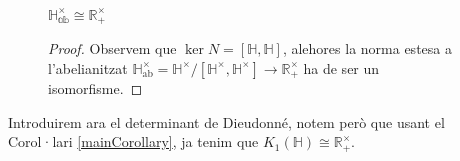 \begin{figure}[!htb]
    \centering
    \begin{minipage}{.66\textwidth}
        \begin{cor} \label{HR}
$\mathbb{H_\text{ab}^\times}\cong \mathbb{R}^\times_+$
\end{cor}
\begin{proof}
Observem que $\ker N = [\mathbb{H},\mathbb{H}]$, alehores la norma estesa a l'abelianitzat $\mathbb{H}_\text{ab}^\times=\mathbb{H^\times}/[\mathbb{H}^\times,\mathbb{H}^\times] \rightarrow \mathbb{R}^\times_+$ ha de ser un isomorfisme.
\end{proof}
        
    \end{minipage}%
    \begin{minipage}{0.33\textwidth}
    \hspace{1cm}
    \end{minipage}
\end{figure}

Introduirem ara el determinant de Dieudonné, notem però que usant el Corol·lari \ref{mainCorollary}, ja tenim que $K_1(\mathbb{H})\cong \mathbb{R}^\times_+$.

